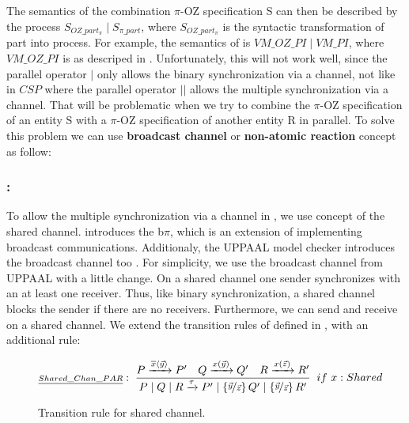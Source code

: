 The semantics of the combination $\pi$-OZ specification S can then be described by the \picalc{} process $S_{OZ\_part_\pi} \mid S_{\pi\_part}$, where $S_{OZ\_part_\pi}$ is the syntactic transformation of \oz{} part into \picalc{} process. For example, the semantics of  is $VM\_OZ\_PI \mid VM\_PI$, where $VM\_OZ\_PI$ is as descriped in . Unfortunately, this will not work well, since the parallel operator $|$ only allows the binary synchronization via a channel, not like in $CSP$ where the parallel operator $||$ allows the multiple synchronization via a channel. That will be problematic when we try to combine the $\pi$-OZ specification of an entity S with a $\pi$-OZ specification of another entity R in parallel. To solve this problem we can use \textbf{broadcast channel} or  \textbf{non-atomic reaction} concept as follow:

\subsubsection{:}
To allow the multiple synchronization via a channel in \picalc{}, we use concept of the shared channel. \cite{ene} introduces the b$\pi$, which is an extension of \picalc{} implementing broadcast communications. Additionaly, the UPPAAL model checker introduces the broadcast channel too \cite{olderog08}. For simplicity, we use the broadcast channel from UPPAAL with a little change. On a shared channel one sender synchronizes with an at least one receiver. Thus, like binary synchronization, a shared channel blocks the sender if there are no receivers. Furthermore, we can send and receive on a shared channel. We extend the transition rules of \picalc{} defined in , with an additional rule:
\begin{figure}[H]
\begin{gather*}
\kalRuleM[if\ x: Shared]{Shared\_Chan\_PAR}{}{P \transs{\out{x}{\vec{y}}} P'}{Q \transs{\inp{x}{\vec{y}}} Q'}{R \transs{\inp{x}{\vec{z}}} R'}{\procpar{\procpar{P}{Q}}{R} \transs{\tau} 
\procpar{P'}{\procpar{\substitue{\vec{y}}{\vec{z}}Q'}{\substitue{\vec{y}}{\vec{z}}R'}}
}
\end{gather*}
\caption{Transition rule for shared channel.}
\label{fig_broadcast_channel}
\end{figure}



